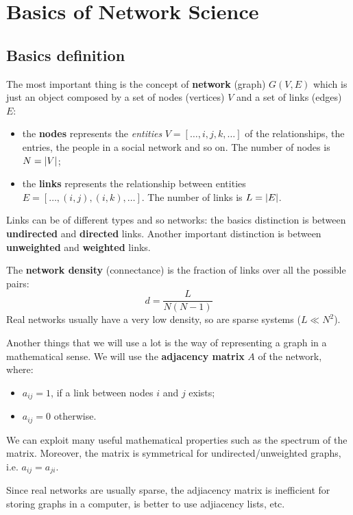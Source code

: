 \documentclass[../main/main.tex]{subfiles}
\begin{document}
\chapter{Basics of Network Science}

\section{Basics definition}

The most important thing is the concept of \textbf{network} (graph) \( G(V,E) \) which is just an object composed by a set of nodes (vertices) \( V \) and a set of links (edges) \( E \):
\begin{itemize}
\item the \textbf{nodes} represents the \emph{entities} \( V=[\dots,i,j,k,\dots] \) of the relationships, the entries, the people in a social network and so on. The number of nodes is \( N= \abs{V}  \);

\item the \textbf{links} represents the relationship between entities \( E=[\dots,(i,j),(i,k),\dots] \). The number of links is \( L= \abs{E}  \).
\end{itemize}

Links can be of different types and so networks: the basics distinction is between \textbf{undirected} and \textbf{directed} links.
Another important distinction is between \textbf{unweighted} and \textbf{weighted} links.

The \textbf{network density} (connectance) is the fraction of links over all the possible pairs:
\begin{equation}
  d = \frac{L}{N(N-1)}
\end{equation}
Real networks usually have a very low density, so are sparse systems (\( L \ll N^2 \)).

Another things that we will use a lot is the way of representing a graph in a mathematical sense. We will use the \textbf{adjacency matrix} \( A \) of the network, where:
\begin{itemize}
\item \( a_{ij} = 1 \), if a link between nodes \( i \) and \( j \) exists;
\item \( a_{ij} = 0 \) otherwise.
\end{itemize}
We can exploit many useful mathematical properties such as the spectrum of the matrix. Moreover, the matrix is symmetrical for undirected/unweighted graphs, i.e. \( a_{ij} = a_{ji} \).

Since real networks are usually sparse, the adjiacency matrix is inefficient for storing graphs in a computer, is better to use adjiacency lists, etc.
\end{document}
